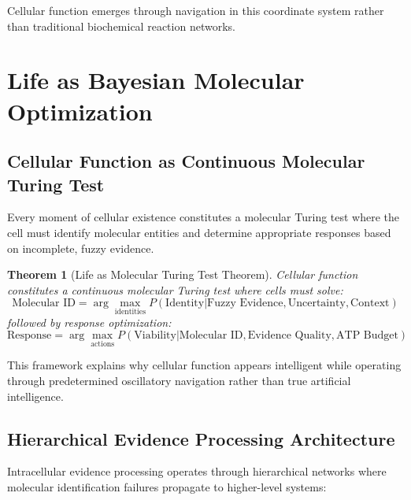 \documentclass[12pt,a4paper]{article}
\newtheorem{theorem}{Theorem}
\begin{document}
Cellular function emerges through navigation in this coordinate system rather than traditional biochemical reaction networks.

\section{Life as Bayesian Molecular Optimization}

\subsection{Cellular Function as Continuous Molecular Turing Test}

Every moment of cellular existence constitutes a molecular Turing test where the cell must identify molecular entities and determine appropriate responses based on incomplete, fuzzy evidence.

\begin{theorem}[Life as Molecular Turing Test Theorem]
Cellular function constitutes a continuous molecular Turing test where cells must solve:
\begin{equation}
\text{Molecular ID} = \arg\max_{\text{identities}} P(\text{Identity} | \text{Fuzzy Evidence}, \text{Uncertainty}, \text{Context})
\end{equation}
followed by response optimization:
\begin{equation}
\text{Response} = \arg\max_{\text{actions}} P(\text{Viability} | \text{Molecular ID}, \text{Evidence Quality}, \text{ATP Budget})
\end{equation}
\end{theorem}

This framework explains why cellular function appears intelligent while operating through predetermined oscillatory navigation rather than true artificial intelligence.

\subsection{Hierarchical Evidence Processing Architecture}

Intracellular evidence processing operates through hierarchical networks where molecular identification failures propagate to higher-level systems:
\end{document}
